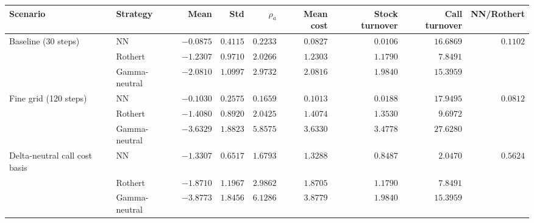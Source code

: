 \begin{tabular}{llrrrrrrr}
\toprule
Scenario & Strategy & Mean & Std & $\rho_a$ & Mean cost & Stock turnover & Call turnover & NN/Rothert \\
\midrule
Baseline (30 steps) & NN & $-0.0875$ & $0.4115$ & $0.2233$ & $0.0827$ & $0.0106$ & $16.6869$ & $0.1102$ \\
 & Rothert & $-1.2307$ & $0.9710$ & $2.0266$ & $1.2303$ & $1.1790$ & $7.8491$ &  \\
 & Gamma-neutral & $-2.0810$ & $1.0997$ & $2.9732$ & $2.0816$ & $1.9840$ & $15.3959$ &  \\
Fine grid (120 steps) & NN & $-0.1030$ & $0.2575$ & $0.1659$ & $0.1013$ & $0.0188$ & $17.9495$ & $0.0812$ \\
 & Rothert & $-1.4080$ & $0.8920$ & $2.0425$ & $1.4074$ & $1.3530$ & $9.6972$ &  \\
 & Gamma-neutral & $-3.6329$ & $1.8823$ & $5.8575$ & $3.6330$ & $3.4778$ & $27.6280$ &  \\
Delta-neutral call cost basis & NN & $-1.3307$ & $0.6517$ & $1.6793$ & $1.3288$ & $0.8487$ & $2.0470$ & $0.5624$ \\
 & Rothert & $-1.8710$ & $1.1967$ & $2.9862$ & $1.8705$ & $1.1790$ & $7.8491$ &  \\
 & Gamma-neutral & $-3.8773$ & $1.8456$ & $6.1286$ & $3.8779$ & $1.9840$ & $15.3959$ &  \\
\bottomrule
\end{tabular}
